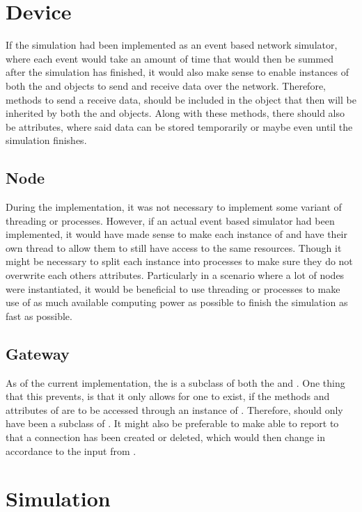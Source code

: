 \section{Device}
If the simulation had been implemented as an event based network simulator, where each event would take an amount of time that would then be summed after the simulation has finished, it would also make sense to enable instances of both the  and  objects to send and receive data over the network. Therefore, methods to send a receive data, should be included in the  object that then will be inherited by both the  and  objects. Along with these methods, there should also be attributes, where said data can be stored temporarily or maybe even until the simulation finishes.


\subsection{Node}
During the implementation, it was not necessary to implement some variant of threading or processes. However, if an actual event based simulator had been implemented, it would have made sense to make each instance of  and  have their own thread to allow them to still have access to the same resources. Though it might be necessary to split each instance into processes to make sure they do not overwrite each others attributes. Particularly in a scenario where a lot of nodes were instantiated, it would be beneficial to use threading or processes to make use of as much available computing power as possible to finish the simulation as fast as possible.


\subsection{Gateway}
As of the current implementation, the  is a subclass of both the  and . One thing that this prevents, is that it only allows for one  to exist, if the methods and attributes of  are to be accessed through an instance of . Therefore,  should only have been a subclass of . It might also be preferable to make  able to report to  that a connection has been created or deleted, which would then change  in accordance to the input from .


\section{Simulation}



































